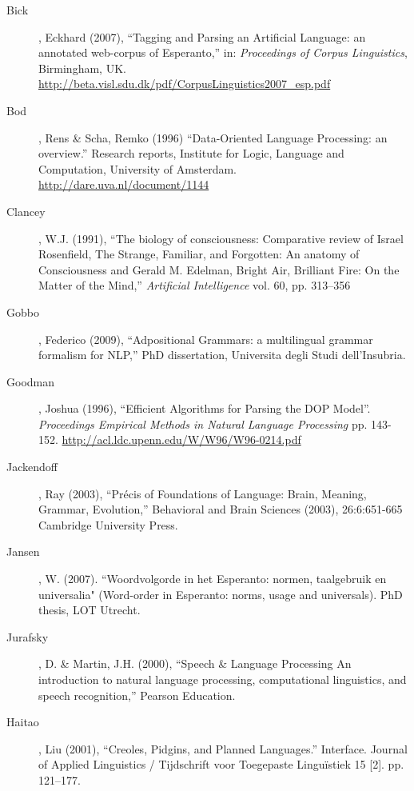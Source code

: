 \documentclass[10pt,a4paper]{article}
\begin{document}
\begin{description}
\item[Bick], Eckhard (2007), ``Tagging and Parsing an Artificial Language: an
annotated web-corpus of Esperanto,'' in: {\em Proceedings of Corpus
Linguistics}, Birmingham, UK.
\url{http://beta.visl.sdu.dk/pdf/CorpusLinguistics2007_esp.pdf}

\item[Bod], Rens \& Scha, Remko (1996) ``Data-Oriented Language Processing: an
overview.'' Research reports, Institute for Logic, Language and Computation,
University of Amsterdam. \url{http://dare.uva.nl/document/1144}

\item[Clancey], W.J. (1991), ``The biology of consciousness: Comparative review
of Israel Rosenfield, The Strange, Familiar, and Forgotten: An anatomy of
Consciousness and Gerald M. Edelman, Bright Air, Brilliant Fire: On the Matter
of the Mind,'' {\em Artificial Intelligence} vol. 60, pp. 313--356

\item[Gobbo], Federico (2009), ``Adpositional Grammars: a multilingual grammar
formalism for NLP,'' PhD dissertation, Universita degli Studi dell'Insubria.

\item[Goodman], Joshua (1996), ``Efficient Algorithms for Parsing the DOP Model''. {\em Proceedings Empirical Methods in Natural Language Processing} pp. 143-152.
\url{http://acl.ldc.upenn.edu/W/W96/W96-0214.pdf}

\item[Jackendoff], Ray (2003), ``Précis of Foundations of Language: Brain, Meaning,
Grammar, Evolution,'' Behavioral and Brain Sciences (2003), 26:6:651-665
Cambridge University Press.

\item[Jansen], W. (2007). ``Woordvolgorde in het Esperanto: normen, taalgebruik en
universalia" (Word-order in Esperanto: norms, usage and universals). PhD
thesis, LOT Utrecht.

\item[Jurafsky], D. \& Martin, J.H. (2000), ``Speech \& Language Processing An
introduction to natural language processing, computational linguistics, and
speech recognition,'' Pearson Education.

\item[Haitao], Liu (2001), ``Creoles, Pidgins, and Planned Languages.'' Interface.
Journal of Applied Linguistics / Tijdschrift voor Toegepaste Linguïstiek 15 [2]. pp. 121--177.


\end{description}
\end{document}
